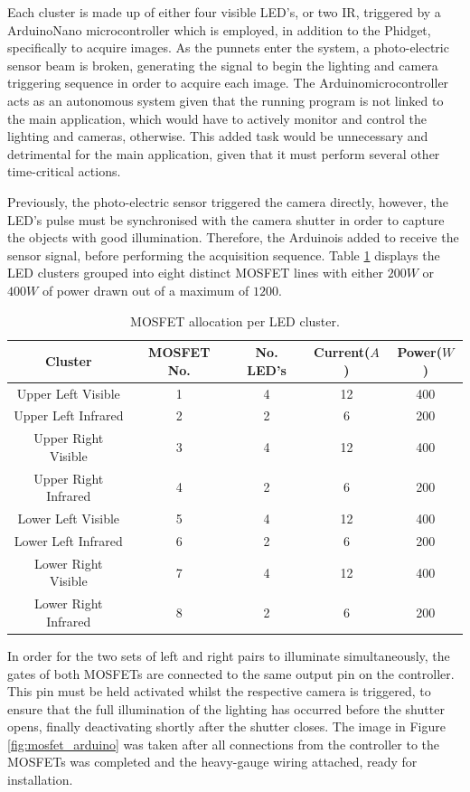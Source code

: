 \documentclass[fleqn,twoside,12pt]{report}
\begin{document}
Each cluster is made up of either four visible LED's, or two IR, triggered by a Arduino\texttrademark Nano microcontroller which is employed, in addition to the Phidget\textregistered, specifically to acquire images. As the punnets enter the system, a photo-electric sensor beam is broken, generating the signal to begin the lighting and camera triggering sequence in order to acquire each image. The Arduino\texttrademark microcontroller acts as an autonomous system given that the running program is not linked to the main application, which would have to actively monitor and control the lighting and cameras, otherwise. This added task would be unnecessary and detrimental for the main application, given that it must perform several other time-critical actions.   

Previously, the photo-electric sensor triggered the camera directly, however, the LED's pulse must be synchronised with the camera shutter in order to capture the objects with good illumination. Therefore, the Arduino\texttrademark is added to receive the sensor signal, before performing the acquisition sequence. Table \ref{tab:mosfets} displays the LED clusters grouped into eight distinct MOSFET lines with either $200W$ or $400W$ of power drawn out of a maximum of $1200$.  


\begin{table}
	\centering
	\caption{MOSFET allocation per LED cluster.}
	\label{tab:mosfets}
	\begin{tabular}{ccccc}
		\toprule
		Cluster & MOSFET No. & No. LED's & Current($A$) & Power($W$)  \\ 
		\midrule
		Upper Left Visible   	& 1 & 4 & 12 & 400   \\[6pt] 
		Upper Left Infrared		& 2 & 2 & 6  & 200   \\[6pt] 
		Upper Right Visible   	& 3 & 4 & 12 & 400   \\[6pt] 
		Upper Right Infrared	& 4 & 2 & 6  & 200   \\[6pt] 
		Lower Left Visible   	& 5 & 4 & 12 & 400   \\[6pt] 
		Lower Left Infrared		& 6 & 2 & 6  & 200   \\[6pt] 
		Lower Right Visible   	& 7 & 4 & 12 & 400   \\[6pt] 
		Lower Right Infrared	& 8 & 2 & 6  & 200   \\[6pt] 
		\bottomrule
	\end{tabular}
\end{table}

In order for the two sets of left and right pairs to illuminate simultaneously, the gates of both MOSFETs are connected to the same output pin on the controller. This pin must be held activated whilst the respective camera is triggered, to ensure that the full illumination of the lighting has occurred before the shutter opens, finally deactivating shortly after the shutter closes. The image in Figure \ref{fig:mosfet_arduino} was taken after all connections from the controller to the MOSFETs was completed and the heavy-gauge wiring attached, ready for installation. 
\end{document}

